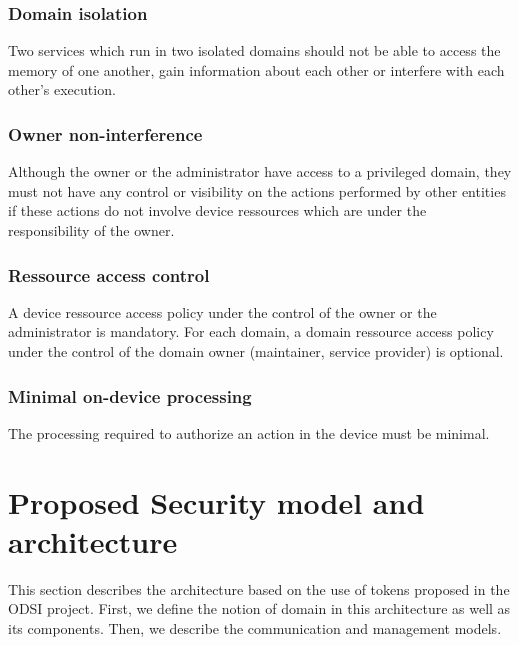 \documentclass[conference]{IEEEtran}
\begin{document}
\subsubsection{Domain isolation}
Two services which run in two isolated domains should not be able to access the memory of one another, gain information about each other or interfere with each other's execution. 

\subsubsection{Owner non-interference}
Although the owner or the administrator have access to a privileged domain, they must not have any control or visibility on the actions performed by other entities if these actions do not involve device ressources which are under the responsibility of the owner.

\subsubsection{Ressource access control}
A device ressource access policy under the control of the owner or the administrator is mandatory. For each domain, a domain ressource access policy under the control of the domain owner (maintainer, service provider) is optional. 

\subsubsection{Minimal on-device processing}
The processing required to authorize an action in the device must be minimal. 

\section{Proposed Security model and architecture}
\label{sec:Architecture}
This section describes the architecture based on the use of tokens proposed in the ODSI project. First, we define the notion of domain in this architecture as well as its components. Then, we describe the communication and management models.
\end{document}
